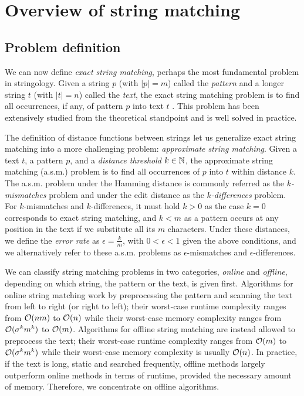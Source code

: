 
\section{Overview of string matching}

\subsection{Problem definition}

We can now define \emph{exact string matching}, perhaps the most fundamental problem in stringology.
Given a string $p$ (with $|p|=m$) called the \emph{pattern} and a longer string $t$ (with $|t|=n$) called the \emph{text}, the exact string matching problem is to find all occurrences, if any, of pattern $p$ into text $t$ \cite{Gusfield1997}.
This problem has been extensively studied from the theoretical standpoint and is well solved in practice.

The definition of distance functions between strings let us generalize exact string matching into a more challenging problem: \emph{approximate string matching}.
Given a text $t$, a pattern $p$, and a \emph{distance threshold} $k \in \mathbb {N}$, the approximate string matching (a.s.m.) problem is to find all occurrences of $p$ into $t$ within distance $k$.
The a.s.m. problem under the Hamming distance is commonly referred as the \emph{$k$-mismatches} problem and under the edit distance as the \emph{$k$-differences} problem.
For $k$-mismatches and $k$-differences, it must hold $k > 0$ as the case $k = 0$ corresponds to exact string matching, and $k < m$ as a pattern occurs at any position in the text if we substitute all its $m$ characters.
Under these distances, we define the \emph{error rate} as $\epsilon = \frac{k}{m}$, with $0 < \epsilon < 1$ given the above conditions, and we alternatively refer to these a.s.m. problems as $\epsilon$-mismatches and $\epsilon$-differences.

We can classify string matching problems in two categories, \emph{online} and \emph{offline}, depending on which string, the pattern or the text, is given first.
Algorithms for online string matching work by preprocessing the pattern and scanning the text from left to right (or right to left); their worst-case runtime complexity ranges from $\mathcal{O}(nm)$ to $\mathcal{O}(n)$ while their worst-case memory complexity ranges from $\mathcal{O}(\sigma^k m^k)$ to $\mathcal{O}(m)$.
Algorithms for offline string matching are instead allowed to preprocess the text; their worst-case runtime complexity ranges from $\mathcal{O}(m)$ to $\mathcal{O}(\sigma^k m^k)$ while their worst-case memory complexity is usually $\mathcal{O}(n)$.
In practice, if the text is long, static and searched frequently, offline methods largely outperform online methods in terms of runtime, provided the necessary amount of memory. Therefore, we concentrate on offline algorithms.

